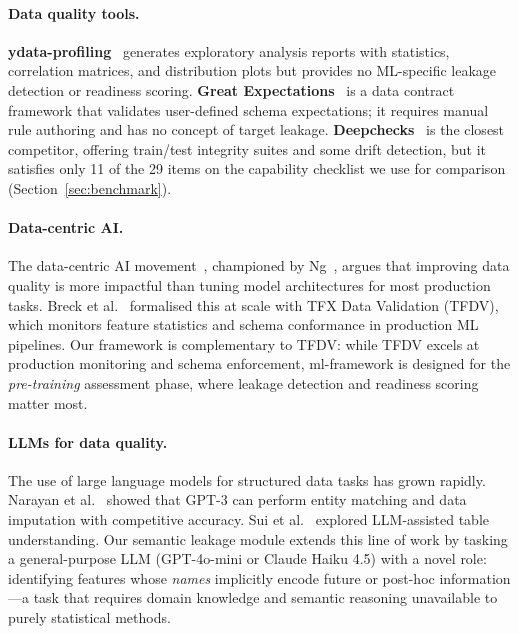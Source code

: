 \documentclass[11pt]{article}
\begin{document}
\paragraph{Data quality tools.}
\textbf{ydata-profiling}~\cite{ydataprofiling} generates exploratory analysis
reports with statistics, correlation matrices, and distribution plots but
provides no ML-specific leakage detection or readiness scoring.
\textbf{Great Expectations}~\cite{greatexpectations} is a data contract
framework that validates user-defined schema expectations; it requires manual
rule authoring and has no concept of target leakage.
\textbf{Deepchecks}~\cite{deepchecks} is the closest competitor, offering
train/test integrity suites and some drift detection, but it satisfies only
11 of the 29 items on the capability checklist we use for comparison
(Section~\ref{sec:benchmark}).

\paragraph{Data-centric AI.}
The data-centric AI movement~\cite{zha2023datacentric}, championed by
Ng~\cite{ng2021datacentric},
argues that improving data quality is more impactful than tuning model
architectures for most production tasks.  Breck et al.~\cite{breck2019data}
formalised this at scale with TFX Data Validation (TFDV), which monitors
feature statistics and schema conformance in production ML pipelines.  Our
framework is complementary to TFDV: while TFDV excels at production
monitoring and schema enforcement, ml-framework is designed for the
\emph{pre-training} assessment phase, where leakage detection and readiness
scoring matter most.

\paragraph{LLMs for data quality.}
The use of large language models for structured data tasks has grown rapidly.
Narayan et al.~\cite{narayan2022can} showed that GPT-3 can perform entity
matching and data imputation with competitive accuracy.  Sui et al.~\cite{sui2023tap4llm}
explored LLM-assisted table understanding.  Our semantic leakage module
extends this line of work by tasking a general-purpose LLM (GPT-4o-mini or
Claude Haiku 4.5) with a novel role:
identifying features whose \emph{names} implicitly encode future or
post-hoc information---a task that requires domain knowledge and semantic
reasoning unavailable to purely statistical methods.
\end{document}

